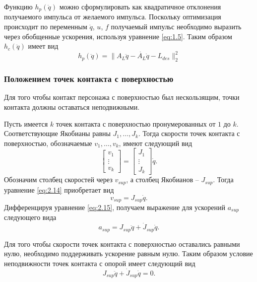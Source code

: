 Функцию $h_{p}(\ddot{q})$ можно сформулировать как квадратичное отклонения получаемого импульса от желаемого импульса. Поскольку оптимизация происходит по переменным $\ddot{q}$, $u$, $f$ получаемый импульс необходимо выразить через обобщенные ускорения, используя уравнение \ref{eq:1.5}. Таким образом $h_c(\ddot{q})$ имеет вид
\begin{equation*}
  h_{p}(\ddot{q}) = \lVert A_{L}\ddot{q} - \dot{A_{L}} \dot{q} - L_{des} \rVert_{2}^{2} \tag{2.13}\label{eq:2.13}
\end{equation*}

\subsubsection{Положением точек контакта с поверхностью}

Для того чтобы контакт персонажа с поверхностью был нескользящим, точки контакта должны оставаться неподвижными.

Пусть имеется $k$ точек контакта с поверхностью пронумерованных от $1$ до $k$. Соответствующие Якобианы равны $J_{1}, \ldots, J_{k}$. Тогда скорости точек контакта с поверхностью, обозначаемые $v_{1}, \ldots, v_{k}$, имеют следующий вид
\begin{equation*}
  \begin{bmatrix} v_{1} \\ \vdots \\ v_{k} \end{bmatrix} = \begin{bmatrix} J_{1} \\ \vdots \\ J_{k} \end{bmatrix} \dot{q}. \tag{2.14}\label{eq:2.14}
\end{equation*}
Обозначим столбец скоростей через $v_{sup}$, а столбец Якобианов -- $J_{sup}$. Тогда уравнение \ref{eq:2.14} приобретает вид
\begin{equation*}
  v_{sup} = J_{sup} \dot{q}. \tag{2.15}\label{eq:2.15}
\end{equation*}
Дифференцируя уравнение \ref{eq:2.15}, получаем выражение для ускорений $a_{sup}$ следующего вида
\begin{equation*}
  a_{sup} = J_{sup} \ddot{q} + \dot{J}_{sup} \dot{q}. \tag{2.16}\label{eq:2.16}
\end{equation*}

Для того чтобы скорости точек контакта с поверхностью оставались равными нулю, необходимо поддерживать ускорение равным нулю. Таким образом условие неподвижности точек контакта с опорой имеет следующий вид
\begin{equation*}
  J_{sup} \ddot{q} + \dot{J}_{sup} \dot{q} = 0. \tag{2.17}\label{eq:2.17}
\end{equation*}

